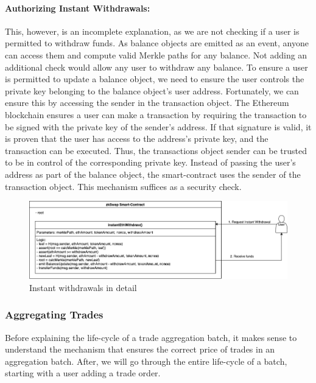 \documentclass[../../thesis.tex]{subfiles}
\begin{document}
\paragraph{Authorizing Instant Withdrawals:}
This, however, is an incomplete explanation, as we are not checking if a user is permitted to withdraw funds. As balance objects are emitted as an event, anyone can access them and compute valid Merkle paths for any balance. Not adding an additional check would allow any user to withdraw any balance. To ensure a user is permitted to update a balance object, we need to ensure the user controls the private key belonging to the balance object's user address. Fortunately, we can ensure this by accessing the sender in the transaction object. The Ethereum blockchain ensures a user can make a transaction by requiring the transaction to be signed with the private key of the sender's address. If that signature is valid, it is proven that the user has access to the address's private key, and the transaction can be executed. Thus, the transactions object sender can be trusted to be in control of the corresponding private key. Instead of passing the user's address as part of the balance object, the smart-contract uses the sender of the transaction object. This mechanism suffices as a security check.

\begin{figure}[h]
    \centerline{\includegraphics[totalheight=3.7cm]{diagrams/instantWithdraw.png}}
    \caption{Instant withdrawals in detail}
    \label{fig:instWith}
\end{figure}

\subsubsection{Aggregating Trades}
Before explaining the life-cycle of a trade aggregation batch, it makes sense to understand the mechanism that ensures the correct price of trades in an aggregation batch. After, we will go through the entire life-cycle of a batch, starting with a user adding a trade order. 
\end{document}
